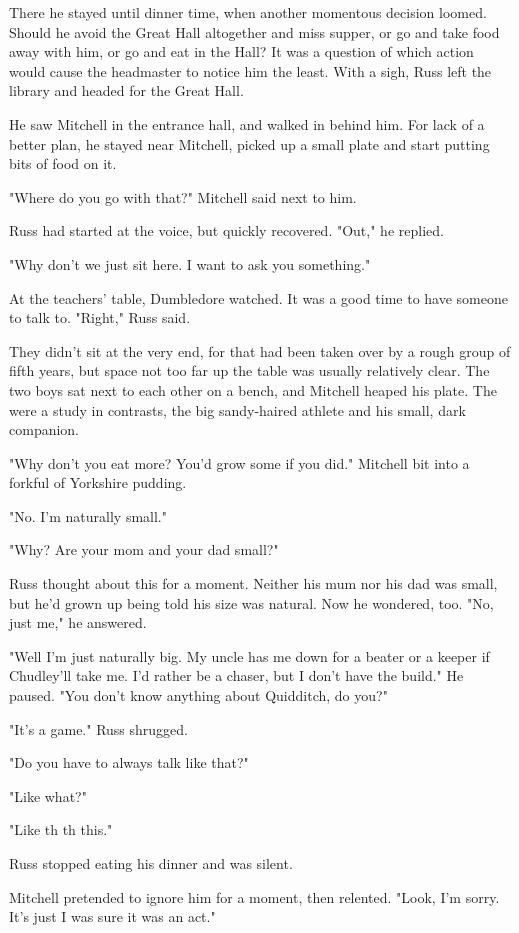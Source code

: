 There he stayed until dinner time, when another momentous decision loomed. Should he avoid the Great Hall altogether and miss supper, or go and take food away with him, or go and eat in the Hall? It was a question of which action would cause the headmaster to notice him the least. With a sigh, Russ left the library and headed for the Great Hall.

He saw Mitchell in the entrance hall, and walked in behind him. For lack of a better plan, he stayed near Mitchell, picked up a small plate and start putting bits of food on it.

"Where do you go with that?" Mitchell said next to him.

Russ had started at the voice, but quickly recovered. "Out," he replied.

"Why don't we just sit here. I want to ask you something."

At the teachers' table, Dumbledore watched. It was a good time to have someone to talk to. "Right," Russ said.

They didn't sit at the very end, for that had been taken over by a rough group of fifth years, but space not too far up the table was usually relatively clear. The two boys sat next to each other on a bench, and Mitchell heaped his plate. The were a study in contrasts, the big sandy-haired athlete and his small, dark companion.

"Why don't you eat more? You'd grow some if you did." Mitchell bit into a forkful of Yorkshire pudding.

"No. I'm naturally{\el} small."

"Why? Are your mom and your dad small?"

Russ thought about this for a moment. Neither his mum nor his dad was small, but he'd grown up being told his size was natural. Now he wondered, too. "No, just me," he answered.

"Well I'm just naturally big. My uncle has me down for a beater or a keeper if Chudley'll take me. I'd rather be a chaser, but I don't have the build." He paused. "You don't know anything about Quidditch, do you?"

"It's a{\el} game." Russ shrugged.

"Do you have to always talk like that?"

"Like{\el} what?"

"Like th{\el} th{\el} this."

Russ stopped eating his dinner and was silent.

Mitchell pretended to ignore him for a moment, then relented. "Look, I'm sorry. It's just I was sure it was an act."


